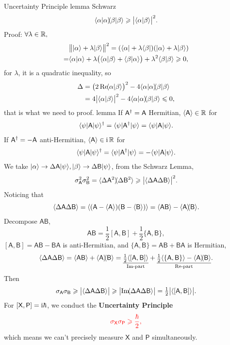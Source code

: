 \documentclass{article}
\newcommand*{\op}[1]{\mathsf{#1}}
\newcommand{\ko}[1]{\hspace{-#1 pt}}
\newcommand{\spark}[1]{\textcolor{red}{#1}}
\begin{document}
\begin{theorem}{Uncertainty Principle}{}
	lemma Schwarz
	\begin{equation}
		\brkt\alpha\alpha\ko3\brkt\beta\beta\geqslant\bigabs{\brkt\alpha\beta}^2.
	\end{equation}
		Proof: $\forall\lambda\in\mathbb{R},$
		\begin{align*}
			  & \bigl\lVert\lvert\alpha\rangle+\lambda\lvert\beta\rangle\bigr\rVert^2=(\langle\alpha\rvert+\lambda\langle\beta\rvert)(\lvert\alpha\rangle+\lambda\lvert\beta\rangle)        \\
			= & \langle\alpha\vert\alpha\rangle+\lambda\bigl(\langle\alpha\vert\beta\rangle+\langle\beta\vert\alpha\rangle\bigr)+\lambda^2\langle\beta\vert\beta\rangle\geqslant 0,
		\end{align*}
		for $\lambda$, it is a quadratic inequality, so
		\begin{align*}
			\Delta & =\bigl(2\,\text{Re}\ko2\brkt\alpha\beta\bigr)^2-4\brkt\alpha\alpha\ko3\brkt\beta\beta \\
			       & =4\bigabs{\brkt\alpha\beta}^2-4\brkt\alpha\alpha\ko3\brkt\beta\beta\leqslant 0,
		\end{align*}
		that is what we need to proof.
	lemma
		If $\op{A}\adjoint=\op{A}$ Hermitian, $\ave{\op{A}}\in\RR$ for
		$$\bra\psi\op{A}\ket\psi\adjoint=\bra\psi\op{A}\adjoint\ket\psi=\bra\psi\op{A}\ket\psi.$$
		If $\op{A}\adjoint=-\op{A}$ anti-Hermitian, $\ave{\op{A}}\in \i\,\RR$ for
		$$\bra\psi\op{A}\ket\psi\adjoint=\bra\psi\op{A}\adjoint\ket\psi=-\bra\psi\op{A}\ket\psi.$$
	We take $\ket\alpha\rightarrow\Delta\op{A}\ket\psi,\ket\beta\rightarrow\Delta\op{B}\ket\psi$, from the Schwarz Lemma,
	$$\sigma_{\op{A}}^2\sigma_{\op{B}}^2=\ave{\Delta\op{A}^2}\ko3\ave{\Delta\op{B}^2}\geqslant\bigabs{\ave{\Delta\op{A}\Delta\op{B}}}^2.$$
	Noticing that
	$$\ave{\Delta\op{A}\Delta\op{B}}=\ave{(\op{A}-\ave{\op{A}})(\op{B}-\ave{\op{B}})}\\
		=\ave{\op{A}\op{B}}-\ave{\op{A}}\ko3\ave{\op{B}}.$$
	Decompose $\op{A}\op{B}$,
	$$\op{A}\op{B}=\textstyle\frac12[\op{A},\op{B}]+\frac12\{\op{A},\op{B}\},$$
	$[\op{A},\op{B}]=\op{A}\op{B}-\op{B}\op{A}$ is anti-Hermitian, and $\{\op{A},\op{B}\}=\op{A}\op{B}+\op{B}\op{A}$ is Hermitian,
	$$\ave{\Delta\op{A}\Delta\op{B}}=\ave{\op{A}\op{B}}+\ave{\op{A}}\ko3\ave{\op{B}}=\underset{\text{Im-part}}{\underline{\textstyle\frac12\ave{[\op{A},\op{B}]}}}+\underset{\text{Re-part}}{\underline{\textstyle\frac12\ave{\{\op{A},\op{B}\}}-\ave{\op{A}}\ko3\ave{\op{B}}}}.$$
	Then
	$$\sigma_{\op{A}}\sigma_{\op{B}}\geqslant\bigabs{\ave{\Delta\op{A}\Delta\op{B}}}\geqslant\bigabs{\text{Im}\ko2\ave{\Delta\op{A}\Delta\op{B}}}=\textstyle\frac12\bigabs{\ave{[\op{A},\op{B}]}}.$$
	For $[\op{X},\op{P}]=\i\hbar$, we conduct the \textbf{Uncertainty Principle}
	$$\spark{\sigma_{\op{X}}\sigma_{\op{P}}\geqslant\frac{\hbar}2,}$$
	which means we can't precisely measure $\op{X}$ and $\op{P}$ simultaneously.
\end{theorem}
\end{document}

